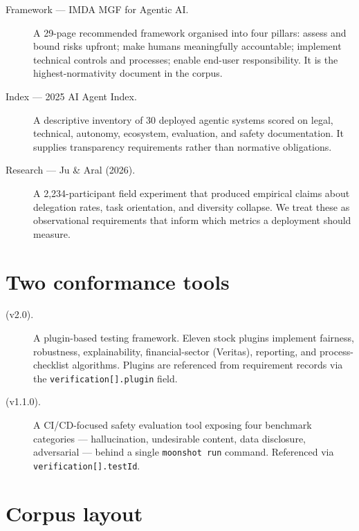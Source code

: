 \begin{description}
  \item[Framework --- IMDA MGF for Agentic AI.] A 29-page recommended
    framework organised into four pillars: assess and bound risks upfront;
    make humans meaningfully accountable; implement technical controls and
    processes; enable end-user responsibility. It is the highest-normativity
    document in the corpus.
  \item[Index --- 2025 AI Agent Index.] A descriptive inventory of 30
    deployed agentic systems scored on legal, technical, autonomy,
    ecosystem, evaluation, and safety documentation. It supplies
    transparency requirements rather than normative obligations.
  \item[Research --- Ju \& Aral (2026).] A 2{,}234-participant field
    experiment that produced empirical claims about delegation rates, task
    orientation, and diversity collapse. We treat these as observational
    requirements that inform which metrics a deployment should measure.
\end{description}

\section{Two conformance tools}

\begin{description}
  \item[ (v2.0).] A plugin-based testing framework. Eleven
    stock plugins implement fairness, robustness, explainability,
    financial-sector (Veritas), reporting, and process-checklist
    algorithms. Plugins are referenced from requirement records via the
    \texttt{verification[].plugin} field.
  \item[ (v1.1.0).] A CI/CD-focused safety evaluation
    tool exposing four benchmark categories --- hallucination, undesirable
    content, data disclosure, adversarial --- behind a single
    \texttt{moonshot run} command. Referenced via
    \texttt{verification[].testId}.
\end{description}

\section{Corpus layout}

